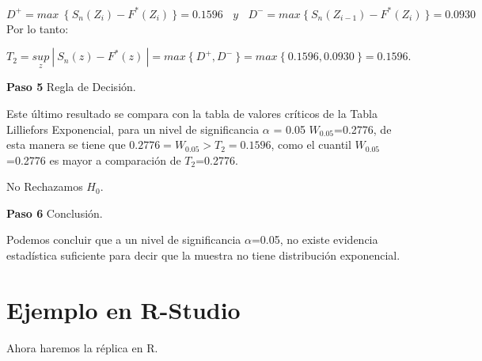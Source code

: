 \documentclass[
  a4paper,
  oneside,
  openany]{book}
\begin{document}
\[ D^+= max \ \  \{\ S_{n}(Z_{i})-F^*(Z_{i}) \ \}= 0.1596 \ \ \ \ y\ \ \ \ D^-= max\  \{ \ S_{n}(Z_{i-1})-F^*(Z_{i}) \ \}=0.0930 \]
Por lo tanto:

\[T_{2}=\underset{z}{sup}\ | \ S_{n}(z)-F^*(z) \ |=max \ \{\ D^+,D^- \ \}=max \ \{ \ 0.1596,0.0930 \ \}=0.1596.\]

\textbf{Paso 5} Regla de Decisión.

Este último resultado se compara con la tabla de valores críticos de la Tabla Lilliefors Exponencial, para un nivel de significancia \(\alpha\) = 0.05 \(W_{0.05}\)=0.2776, de esta manera se tiene que \(0.2776 = W_{0.05} > T_{2} = 0.1596\), como el cuantil \(W_{0.05}\)=0.2776 es mayor a comparación de \(T_{2}\)=0.2776.

No Rechazamos \(H_0\).

\textbf{Paso 6} Conclusión.

Podemos concluir que a un nivel de significancia \(\alpha\)=0.05, no existe evidencia estadística suficiente para decir que la muestra no tiene distribución exponencial.

\hypertarget{ejemplo-en-r-studio-16}{%
\section{Ejemplo en R-Studio}\label{ejemplo-en-r-studio-16}}

Ahora haremos la réplica en R.
\end{document}

